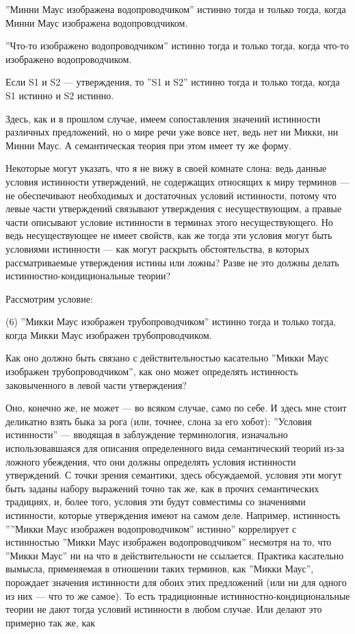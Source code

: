 \documentclass[11pt]{book}
\begin{document}
\smallskip

''Минни Маус изображена водопроводчиком'' истинно тогда и только тогда, когда Минни Маус изображена водопроводчиком.

''Что-то изображено водопроводчиком'' истинно тогда и только тогда, когда что-то изображено водопроводчиком.

Если S1 и S2 --- утверждения, то ''S1 и S2'' истинно тогда и только тогда, когда S1 истинно и S2 истинно.

\smallskip

Здесь, как и в прошлом случае, имеем сопоставления значений истинности различных предложений, но о мире речи уже вовсе нет, ведь нет ни Микки, ни Минни Маус. А семантическая теория при этом имеет ту же форму.

Некоторые могут указать, что я не вижу в своей комнате слона: ведь данные условия истинности утверждений, не содержащих относящих к миру терминов --- не обеспечивают необходимых и достаточных условий истинности, потому что левые части утверждений связывают утверждения с несуществующим, а правые части описывают условие истинности в терминах этого несуществующего. Но ведь несуществующее не имеет свойств, как же тогда эти условия могут быть условиями истинности --- как могут раскрыть обстоятельства, в которых рассматриваемые утверждения истины или ложны? Разве не это должны делать истинностно-кондициональные теории?

Рассмотрим условие:

\smallskip

(6) ''Микки Маус изображен трубопроводчиком'' истинно тогда и только тогда, когда Микки Маус изображен трубопроводчиком.

\smallskip

Как оно должно быть связано с действительностью касательно ''Микки Маус изображен трубопроводчиком'', как оно может определять истинность заковыченного в левой части утверждения?

Оно, конечно же, не может --- во всяком случае, само по себе. И здесь мне стоит деликатно взять быка за рога (или, точнее, слона за его хобот): ''Условия истинности'' --- вводящая в заблуждение терминология, изначально использовавшаяся для описания определенного вида семантический теорий из-за ложного убеждения, что они должны определять условия истинности утверждений. С точки зрения семантики, здесь обсуждаемой, условия эти могут быть заданы набору выражений точно так же, как в прочих семантических традициях, и, более того, условия эти будут совместимы со значениями истинности, которые утверждения имеют на самом деле. Например, истинность ''''Микки Маус изображен водопроводчиком'' истинно'' коррелирует с истинностью ''Микки Маус изображен водопроводчиком'' несмотря на то, что ''Микки Маус'' ни на что в действительности не ссылается. Практика касательно вымысла, применяемая в отношении таких терминов, как ''Микки Маус'', порождает значения истинности для обоих этих предложений (или ни для одного из них --- что то же самое). То есть традиционные истинностно-кондициональные теории не дают тогда условий истинности в любом случае. Или делают это примерно так же, как
\end{document}
